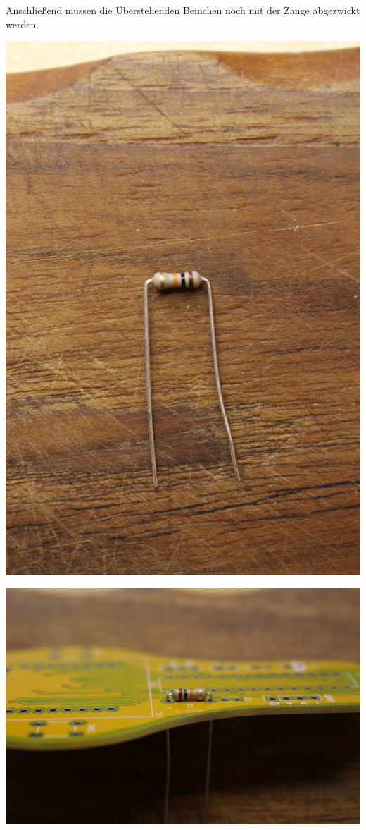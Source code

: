 \documentclass{article}
\begin{document}
Anschließend müssen die Überstehenden Beinchen noch mit der Zange abgezwickt werden.


\begin{minipage}[b]{0.5\textwidth}
	\includegraphics[width=\textwidth]{Bilder/IMG_5538.JPG}
	\label{fig:}
\end{minipage}
\begin{minipage}[b]{0.5\textwidth}
	\includegraphics[width=\textwidth]{Bilder/IMG_5539.JPG}
	\label{fig:}
\end{minipage}
\end{document}
